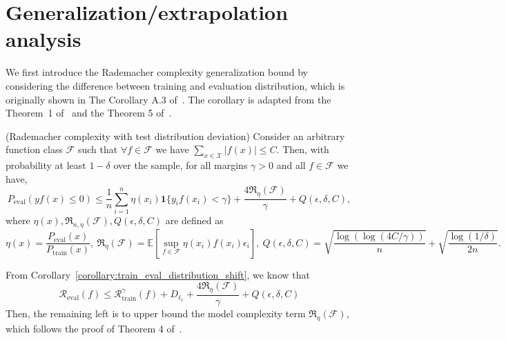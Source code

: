 \clearpage
\section{Generalization/extrapolation analysis} \label{section:generalization}

We first introduce the Rademacher complexity generalization bound by considering the difference between training and evaluation distribution, which is originally shown in The Corollary A.3 of~\cite{xu2021rethinking}. The corollary is adapted from the Theorem~1 of~\cite{koltchinskii2002empirical} and the Theorem 5 of~\cite{kakade2008complexity}. 

\begin{corollary} (Rademacher complexity with test distribution deviation) \label{corollary:train_eval_distribution_shift}
Consider an arbitrary function class $\mathcal{F}$ such that $\forall f\in\mathcal{F}$ we have $\sum_{x \in \mathcal{X}} |f(x)| \leq C$. Then, with probability at least $1-\delta$ over the sample, for all margins $\gamma > 0$ and all $f\in\mathcal{F}$ we have,
\begin{equation*}
    P_\text{eval}(y f(x) \leq 0) \leq \frac{1}{n} \sum_{i=1}^n \eta(x_i) \mathbf{1}\{y_i f(x_i) < \gamma \}  + \frac{4 \mathfrak{R}_\eta(\mathcal{F})}{\gamma} + Q(\epsilon, \delta, C),
\end{equation*}
where $\eta(x), \mathfrak{R}_{n,\eta}(\mathcal{F}), Q(\epsilon, \delta, C)$ are defined as
\begin{equation*}
    \eta(x) = \frac{P_\text{eval}(x)}{P_\text{train}(x)},~
    \mathfrak{R}_\eta(\mathcal{F}) = \mathbb{E}\left[\sup_{f\in\mathcal{F}} \eta(x_i) f(x_i) \epsilon_i\right],~
    Q(\epsilon, \delta, C) = \sqrt{\frac{\log(\log(4C/\gamma))}{n}} + \sqrt{\frac{\log(1/\delta)}{2n}}.
\end{equation*}
\end{corollary}

From Corollary~\ref{corollary:train_eval_distribution_shift}, we know that 
\begin{equation*}
    \mathcal{R}_\text{eval}(f) \leq \mathcal{R}_\text{train}^\gamma(f) + D_{\ell_1} + \frac{4\mathfrak{R}_\eta(\mathcal{F})}{\gamma} + Q(\epsilon,\delta,C)
\end{equation*}
Then, the remaining left is to upper bound the model complexity term $\mathfrak{R}_\eta(\mathcal{F})$, which follows the proof of Theorem 4 of~\cite{koltchinskii2002empirical}.


